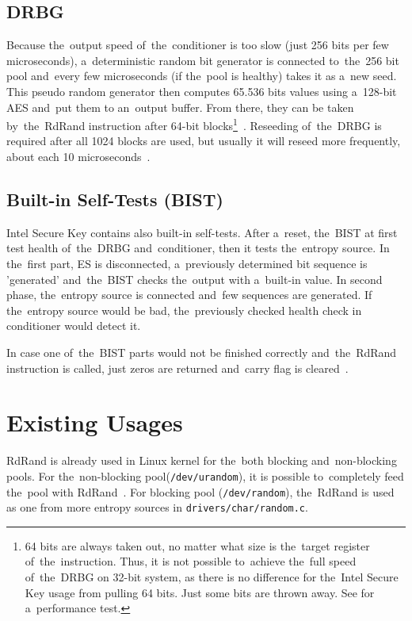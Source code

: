 \subsection{DRBG}\label{subsec:DRBG}
\par{
Because the~output speed of~the~conditioner is too slow (just 256 bits per few 
microseconds), 
a~deterministic random bit generator is connected to~the~256 bit pool 
and~every few microseconds (if the~pool is healthy) takes it as a~new seed. 
This pseudo random generator then computes 65.536 bits values using 
a~128-bit AES and~put them to an~output buffer. 
From there, they can be taken by~the~RdRand instruction after 64-bit 
blocks\footnote{64 bits are always taken out, no matter what size is 
the~target register of~the~instruction. Thus, it is not possible to~achieve the~full 
speed of~the~DRBG on 32-bit system, as there is no difference for the~Intel 
Secure Key usage from pulling 64 bits. Just some bits are thrown away. 
See  for a~performance test.}~\cite{AnalysisOfDRNG,UnderstandingRdRandElectronic}. 
Reseeding of~the~DRBG is required after all 1024 blocks are used, 
but usually it will reseed more frequently, 
about each 10 microseconds~\cite[Chapter~4.4]{IntelDRNGGuide}.
}
\subsection{Built-in Self-Tests (BIST)}
\par{
Intel Secure Key contains also built-in self-tests. After a~reset, the~BIST at first test 
health of~the~DRBG and~conditioner, then it tests the~entropy source. In the~first 
part, ES is disconnected, a~previously determined bit sequence is 'generated' 
and~the~BIST checks the~output with a~built-in value. In second phase, 
the~entropy source is connected and~few sequences are generated. 
If the~entropy source would be bad, the~previously checked health check in conditioner would detect it. 
}

\par{
In case one of~the~BIST parts would not be finished correctly and~the~RdRand 
instruction is called, just zeros are returned and~carry flag is cleared~\cite{AnalysisOfDRNG}.
}

\section{Existing Usages} 
\par{
RdRand is already used in Linux kernel for the~both blocking and~non-blocking pools. For the~non-blocking pool({\tt /dev/urandom}), it is possible to~completely feed the~pool with RdRand~\cite{KernelRdRand}. For blocking pool ({\tt /dev/random}), the~RdRand is used as one from more entropy sources in {\tt drivers/char/random.c}.
}

